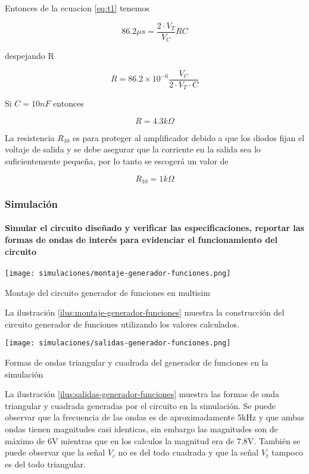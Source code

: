 Entonces de la ecuacion \ref{eq:t1} tenemos

\begin{equation*}
    86.2 \mu s = \frac{2\cdot V_T}{V_C} RC
\end{equation*}

despejando R

\begin{equation}
    R = 86.2 \times10 ^{-6} \frac{V_C}{2 \cdot V_T \cdot C}
\end{equation}

Si $C=10nF$ entonces

\begin{equation}
    R = 4.3k\Omega
\end{equation}

La resistencia $R_{10}$ es para proteger al amplificador debido a que los diodos fijan el voltaje de salida y se debe asegurar que la corriente en la salida sea lo suficientemente pequeña, por lo tanto se escogerá un valor de

\begin{equation}
    R_{10} = 1k\Omega
\end{equation}

\subsubsection{Simulación}

\paragraph{Simular el circuito diseñado y verificar las especificaciones, reportar las formas de ondas de interés para evidenciar el funcionamiento del circuito} 

\begin{ilustracion}[ht]
    \centering
    \texttt{[image: simulaciones/montaje-generador-funciones.png]}
    \caption{Montaje del circuito generador de funciones en multisim}
    \label{ilus:montaje-generador-funciones}
\end{ilustracion}


La ilustración \ref{ilus:montaje-generador-funciones} muestra la construcción del circuito generador de funciones utilizando los valores calculados.

\begin{ilustracion}[ht]
    \centering
    \texttt{[image: simulaciones/salidas-generador-funciones.png]}
    \caption{Formas de ondas triangular y cuadrada del generador de funciones en la simulación}
    \label{ilus:salidas-generador-funciones}
\end{ilustracion}

La ilustración \ref{ilus:salidas-generador-funciones} muestra las formas de onda triangular y cuadrada generadas por el circuito en la simulación. Se puede observar que la frecuencia de las ondas es de aproximadamente 5kHz y que ambas ondas tienen magnitudes casi identicas, sin embargo las magnitudes son de máximo de 6V mientras que en los calculos la magnitud era de 7.8V. También se puede observar que la señal $V_c$ no es del todo cuadrada y que la señal $V_t$ tampoco es del todo triangular.